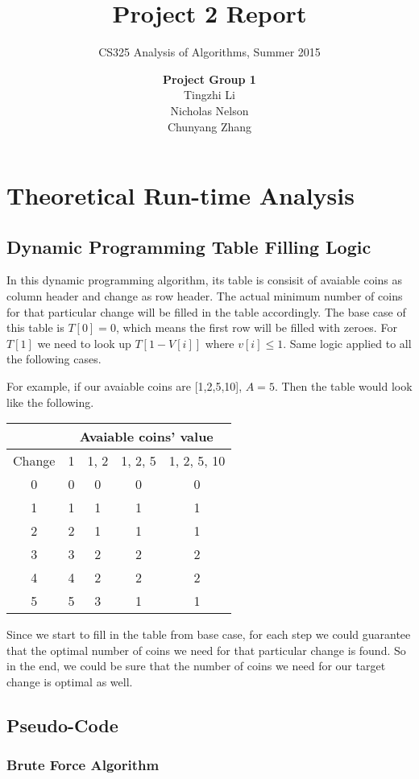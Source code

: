 \documentclass[11pt]{scrreprt}
\title{\textbf{Project 2 Report}}
\subtitle{CS325 Analysis of Algorithms, Summer 2015}
\author{\textsf{\textbf{Project Group 1}}\\
		\textsf{Tingzhi Li}\\
		\textsf{Nicholas Nelson}\\
		\textsf{Chunyang Zhang}}
\date{}
\begin{document}
\maketitle


\chapter{Theoretical Run-time Analysis}

\section{Dynamic Programming Table Filling Logic}

In this dynamic programming algorithm, its table is consisit of avaiable coins as column header and change as row header. The actual minimum number of coins for that particular change will be filled in the table accordingly. The base case of this table is $T[0]=0$, which means the first row will be filled with zeroes. For $T[1]$ we need to look up $T[1-V[i]]$ where $v[i]\leq 1$. Same logic applied to all the following cases.

For example, if our avaiable coins are [1,2,5,10], $A=5$. Then the table would look like the following.

\begin{tabular}{|c|c|c|c|c|}
	\hline & \multicolumn{4}{|c|}{Avaiable coins' value} \\
	\hline Change & 1  & 1, 2 & 1, 2, 5 & 1, 2, 5, 10 \\ 
	\hline 0 & 0 & 0 & 0 & 0 \\ 
	\hline 1 & 1 & 1 & 1 & 1 \\ 
	\hline 2 & 2 & 1 & 1 & 1 \\ 
	\hline 3 & 3 & 2 & 2 & 2 \\ 
	\hline 4 & 4 & 2 & 2 & 2 \\ 
	\hline 5 & 5 & 3 & 1 & 1 \\ 
	\hline 
\end{tabular} 

Since we start to fill in the table from base case, for each step we could guarantee that the optimal number of coins we need for that particular change is found. So in the end, we could be sure that the number of coins we need for our target change is optimal as well.

\section{Pseudo-Code}
\subsection {Brute Force Algorithm}
\end{document}
